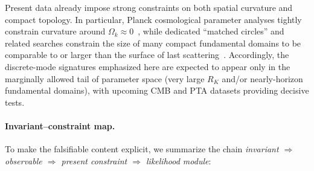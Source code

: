 \documentclass[
  reprint,
  amsmath,amssymb,
  aps,
  prd,
  superscriptaddress,
  nofootinbib,
  longbibliography
]{revtex4-2}
\theoremstyle{definition}
\theoremstyle{remark}
\begin{document}
Present data already impose strong constraints on both spatial curvature and compact topology. In particular,
Planck cosmological parameter analyses tightly constrain curvature around \(\Omega_k\approx 0\)~\cite{Planck2018Cosmo},
while dedicated ``matched circles'' and related searches constrain the size of many compact fundamental domains to be
comparable to or larger than the surface of last scattering~\cite{Planck2015Topology,Saha2024LensSpaces,FutureTopologySearches}.
Accordingly, the discrete-mode signatures emphasized here are expected to appear only in the marginally allowed tail of
parameter space (very large \(R_K\) and/or nearly-horizon fundamental domains), with upcoming CMB and PTA datasets providing
decisive tests.

\paragraph{Invariant--constraint map.}
To make the falsifiable content explicit, we summarize the chain \emph{invariant \(\Rightarrow\) observable \(\Rightarrow\) present constraint \(\Rightarrow\) likelihood module}:
\end{document}
